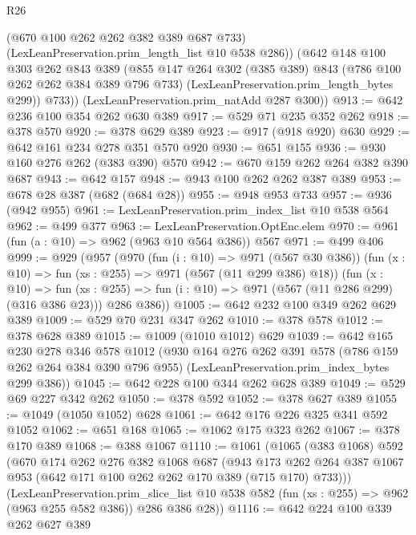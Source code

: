 \begin{lexlean}{R26}
\begin{coremodule}
{{{{{          (@670 @100 @262 @262 @382 @389 @687 @733)
          (LexLeanPreservation.prim_length_list @10 @538 @286))
        (@642
          @148
          @100
          @303
          @262
          @843
          @389
          (@855
            @147
            @264
            @302
            (@385 @389)
            @843
            (@786 @100 @262 @262 @384 @389 @796 @733)
            (LexLeanPreservation.prim_length_bytes @299))
          @733))
      (LexLeanPreservation.prim_natAdd @287 @300))
@913 := @642 @236 @100 @354 @262 @630 @389
@917 := @529 @71 @235 @352 @262
@918 := @378 @570
@920 := @378 @629 @389
@923 := @917 (@918 @920) @630
@929 := @642 @161 @234 @278 @351 @570 @920
@930 := @651 @155
@936 := @930 @160 @276 @262 (@383 @390) @570
@942 := @670 @159 @262 @264 @382 @390 @687
@943 := @642 @157
@948 := @943 @100 @262 @262 @387 @389
@953 := @678 @28 @387 (@682 (@684 @28))
@955 := @948 @953 @733
@957 := @936 (@942 @955)
@961 := LexLeanPreservation.prim_index_list @10 @538 @564
@962 := @499 @377
@963 := LexLeanPreservation.OptEnc.elem
@970 := @961 (fun (a : @10) => @962 (@963 @10 @564 @386)) @567
@971 := @499 @406
@999 := @929
    (@957
      (@970
        (fun (i : @10) => @971 (@567 @30 @386))
        (fun (x : @10) => fun (xs : @255) => @971 (@567 (@11 @299 @386) @18))
        (fun (x : @10) =>
        fun (xs : @255) => fun (i : @10) => @971 (@567 (@11 @286 @299) (@316 @386 @23)))
        @286
        @386))
@1005 := @642 @232 @100 @349 @262 @629 @389
@1009 := @529 @70 @231 @347 @262
@1010 := @378 @578
@1012 := @378 @628 @389
@1015 := @1009 (@1010 @1012) @629
@1039 := @642
    @165
    @230
    @278
    @346
    @578
    @1012
    (@930
      @164
      @276
      @262
      @391
      @578
      (@786 @159 @262 @264 @384 @390 @796 @955)
      (LexLeanPreservation.prim_index_bytes @299 @386))
@1045 := @642 @228 @100 @344 @262 @628 @389
@1049 := @529 @69 @227 @342 @262
@1050 := @378 @592
@1052 := @378 @627 @389
@1055 := @1049 (@1050 @1052) @628
@1061 := @642 @176 @226 @325 @341 @592 @1052
@1062 := @651 @168
@1065 := @1062 @175 @323 @262
@1067 := @378 @170 @389
@1068 := @388 @1067
@1110 := @1061
    (@1065
      (@383 @1068)
      @592
      (@670
        @174
        @262
        @276
        @382
        @1068
        @687
        (@943 @173 @262 @264 @387 @1067 @953 (@642 @171 @100 @262 @262 @170 @389 (@715 @170) @733)))
      (LexLeanPreservation.prim_slice_list
        @10
        @538
        @582
        (fun (xs : @255) => @962 (@963 @255 @582 @386))
        @286
        @386
        @28))
@1116 := @642 @224 @100 @339 @262 @627 @389
}}}}}
\end{coremodule}
\end{lexlean}
